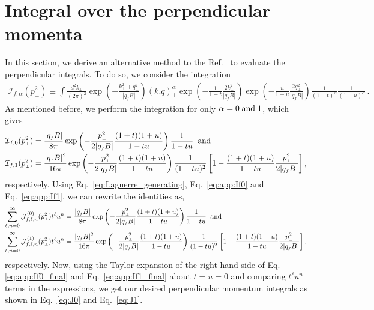 \documentclass[aps,prd,floatfix,showpacs,showkeys,superscriptadress,unsortedaddress,nofootinbib,onecolumn]{revtex4-1}
\newcommand{\sF}{\scriptscriptstyle{f}}
\newcommand{\sperp}{\scriptscriptstyle{\perp}}
\begin{document}
\section{Integral over the perpendicular momenta}
\label{app:perp_intg}
In this section, we derive an alternative method to the Ref.~\cite{Wang:2020dsr} to evaluate the perpendicular integrals.
To do so, we consider the integration 
\begin{align}
\mathcal{I}_{f,\alpha}(p^2_{\sperp})\equiv\int\frac{d^2k_{\perp}}{(2\pi)^2}\exp\left(-\frac{k_{\sperp}^2+q_{\sperp}^2}{|q_{\sF}B|}\right)(k.q)_{\sperp}^{\alpha}\exp\left(-\frac{1}{1-t}\frac{2k_{\sperp}^2}{|q_{\sF}B|}\right)\exp\left(-\frac{u}{1-u}\frac{2q_{\sperp}^2}{|q_{\sF}B|}\right)\frac{1}{(1-t)^{\alpha}}\frac{1}{(1-u)^{\alpha}}\,. 
\label{eq:app:perp_gen}
\end{align}
As mentioned before, we perform the integration for only $\alpha =0\;{\rm and}\;1$, which gives
\begin{align}
\mathcal{I}_{f,0}(p^2_{\sperp}) &= \frac{|q_{\sF}B|}{8\pi}\exp\left(-\frac{p_{\sperp}^2}{2|q_{\sF}B|}\frac{(1+t)(1+u)}{1-tu}\right)\frac{1}{1-tu}\;\; {\rm and}
\label{eq:app:If0}\\
\mathcal{I}_{f,1}(p^2_{\sperp}) &= \frac{|q_{\sF}B|^2}{16\pi}\exp\left(-\frac{p_{\sperp}^2}{2|q_{\sF}B|}\frac{(1+t)(1+u)}{1-tu}\right)\frac{1}{(1-tu)^2}\left[1-\frac{(1+t)(1+u)}{1-tu}\frac{p_{\sperp}^2}{2|q_{\sF}B|}\right], \label{eq:app:If1}
\end{align}
respectively. Using Eq.~\eqref{eq:Laguerre_generating},  Eq.~\eqref{eq:app:If0} and Eq.~\eqref{eq:app:If1}, we can rewrite the identities as,
\begin{align}
\sum_{\ell,n=0}^{\infty}\mathcal{J}^{(0)}_{f,\ell,n}(p_{\sperp}^2)t^{\ell}u^n &= \frac{|q_{\sF}B|}{8\pi}\exp\left(-\frac{p_{\sperp}^2}{2|q_{\sF}B|}\frac{(1+t)(1+u)}{1-tu}\right)\frac{1}{1-tu}\;\; {\rm and}\label{eq:app:If0_final}\\
\sum_{\ell,n=0}^{\infty}\mathcal{J}^{(1)}_{f,\ell,n}(p_{\sperp}^2)t^{\ell}u^n &= \frac{|q_{\sF}B|^2}{16\pi}\exp\left(-\frac{p_{\sperp}^2}{2|q_{\sF}B|}\frac{(1+t)(1+u)}{1-tu}\right)\frac{1}{(1-tu)^2}\left[1-\frac{(1+t)(1+u)}{1-tu}\frac{p_{\sperp}^2}{2|q_{\sF}B|}\right], 
\label{eq:app:If1_final}
\end{align}
respectively. Now, using the Taylor expansion of the right hand side of Eq.\eqref{eq:app:If0_final} and Eq.~\eqref{eq:app:If1_final} about $t=u=0$ and comparing $t^{\ell}u^{n}$ terms in the expressions, we get our desired perpendicular momentum integrals as shown in Eq.~\eqref{eq:J0} and Eq.~\eqref{eq:J1}.


\end{document}

